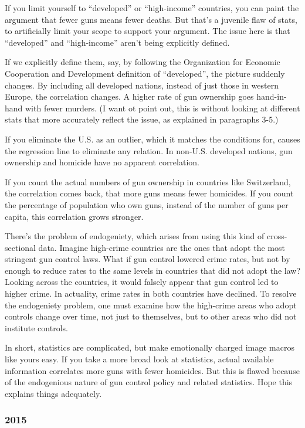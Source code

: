 \documentclass[11pt]{article}
\begin{document}
\begin{itemize}
If you limit yourself to “developed” or “high-income” countries, you can paint the argument that fewer guns means fewer deaths. But that’s a juvenile flaw of stats, to artificially limit your scope to support your argument. The issue here is that “developed” and “high-income” aren’t being explicitly defined.

If we explicitly define them, say, by following the Organization for Economic Cooperation and Development definition of “developed”, the picture suddenly changes. By including all developed nations, instead of just those in western Europe, the correlation changes. A higher rate of gun ownership goes hand-in-hand with fewer murders. (I want ot point out, this is without looking at different stats that more accurately reflect the issue, as explained in paragraphs 3-5.)

If you eliminate the U.S. as an outlier, which it matches the conditions for, causes the regression line to eliminate any relation. In non-U.S. developed nations, gun ownership and homicide have no apparent correlation.

If you count the actual numbers of gun ownership in countries like Switzerland, the correlation comes back, that more guns means fewer homicides. If you count the percentage of population who own guns, instead of the number of guns per capita, this correlation grows stronger.

There’s the problem of endogeniety, which arises from using this kind of cross-sectional data. Imagine high-crime countries are the ones that adopt the most stringent gun control laws. What if gun control lowered crime rates, but not by enough to reduce rates to the same levels in countries that did not adopt the law? Looking across the countries, it would falsely appear that gun control led to higher crime. In actuality, crime rates in both countries have declined. To resolve the endogeniety problem, one must examine how the high-crime areas who adopt controls change over time, not just to themselves, but to other areas who did not institute controls.

In short, statistics are complicated, but make emotionally charged image macros like yours easy. If you take a more broad look at statistics, actual available information correlates more guns with fewer homicides. But this is flawed because of the endogenious nature of gun control policy and related statistics. Hope this explains things adequately.
\end{itemize}
\stopcontents[level-4]
\stopcontents[level-3]
\subsubsection*{2015}
\label{sec:org69ab66c}
\startcontents[level-3]
\end{document}
